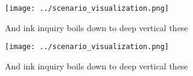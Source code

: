 \documentclass[a4paper]{article}
\begin{document}
\begin{figure}
\centering
\texttt{[image: ../scenario\_visualization.png]}
\caption{And ink inquiry boils down to deep vertical these
}
\end{figure}
 
\begin{figure}
\centering
\texttt{[image: ../scenario\_visualization.png]}
\caption{And ink inquiry boils down to deep vertical these
}
\end{figure}
 
\end{document}
